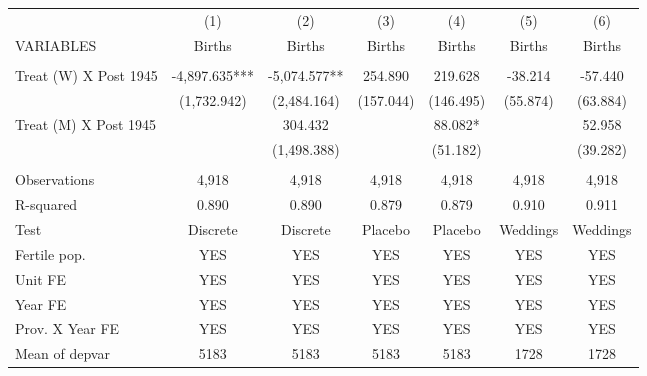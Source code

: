 \begin{tabular}{lcccccc} \hline
 & (1) & (2) & (3) & (4) & (5) & (6) \\
VARIABLES & Births & Births & Births & Births & Births & Births \\ \hline
 &  &  &  &  &  &  \\
Treat (W) X Post 1945 & -4,897.635*** & -5,074.577** & 254.890 & 219.628 & -38.214 & -57.440 \\
 & (1,732.942) & (2,484.164) & (157.044) & (146.495) & (55.874) & (63.884) \\
Treat (M) X Post 1945 &  & 304.432 &  & 88.082* &  & 52.958 \\
 &  & (1,498.388) &  & (51.182) &  & (39.282) \\
 &  &  &  &  &  &  \\
Observations & 4,918 & 4,918 & 4,918 & 4,918 & 4,918 & 4,918 \\
R-squared & 0.890 & 0.890 & 0.879 & 0.879 & 0.910 & 0.911 \\
Test & Discrete & Discrete & Placebo & Placebo & Weddings & Weddings \\
Fertile pop. & YES & YES & YES & YES & YES & YES \\
Unit FE & YES & YES & YES & YES & YES & YES \\
Year FE & YES & YES & YES & YES & YES & YES \\
Prov. X Year FE & YES & YES & YES & YES & YES & YES \\
 Mean of depvar & 5183 & 5183 & 5183 & 5183 & 1728 & 1728 \\ \hline
\end{tabular}
